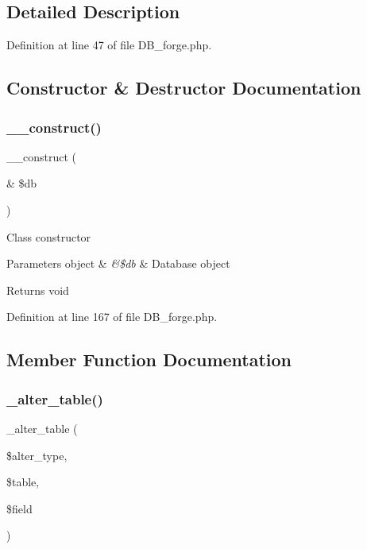 \subsection{Detailed Description}


Definition at line 47 of file D\+B\+\_\+forge.\+php.



\subsection{Constructor \& Destructor Documentation}
\mbox{\label{class_c_i___d_b__forge_aaf2ef772755ec6f361d44e16cc9ffd69}} 
\subsubsection{\texorpdfstring{\_\_construct()}{\_\_construct()}}
{\footnotesize\ttfamily \+\_\+\+\_\+construct (\begin{DoxyParamCaption}\item[{\&}]{\$db }\end{DoxyParamCaption})}

Class constructor


\begin{DoxyParams}[1]{Parameters}
object & {\em \&\$db} & Database object \\
\hline
\end{DoxyParams}
\begin{DoxyReturn}{Returns}
void 
\end{DoxyReturn}


Definition at line 167 of file D\+B\+\_\+forge.\+php.



\subsection{Member Function Documentation}
\mbox{\label{class_c_i___d_b__forge_a41c6cae02f2fda8b429ad0afb9509426}} 
\subsubsection{\texorpdfstring{\_alter\_table()}{\_alter\_table()}}
{\footnotesize\ttfamily \+\_\+alter\+\_\+table (\begin{DoxyParamCaption}\item[{}]{\$alter\+\_\+type,  }\item[{}]{\$table,  }\item[{}]{\$field }\end{DoxyParamCaption})\hspace{0.3cm}{\ttfamily [protected]}}

